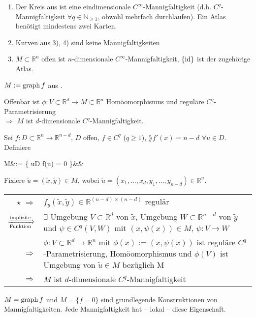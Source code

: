 \begin{example}
	\begin{enumerate}[label={\arabic*)}]
		\item Der Kreis aus  ist eine eindimensionale $C^{\infty}$-Mannigfaltigkeit (d.h. $C^q$-Mannigfaltigkeit $\forall q \in \mathbb{N}_{\ge 1}$, obwohl mehrfach durchlaufen). Ein Atlas benötigt mindestens zwei Karten.
		\item Kurven aus  3), 4) sind keine Mannigfaltigkeiten
		\item $M\subset \mathbb{R}^n$ offen ist $n$-dimensionale $C^\infty$-Mannigfaltigkeit, $\{ \operatorname{id} \}$ ist der zugehörige Atlas.
	\end{enumerate}
\end{example}

\begin{example}
	$M:= \operatorname{graph} f$ aus .
	
	Offenbar ist $\phi\!: V\subset \mathbb{R}^d\to M\subset \mathbb{R}^n$ Homöomorphismus und reguläre $C^q$-Parametrisierung\\
	 $\Rightarrow$ $M$ ist $d$-dimensionale $C^q$-Mannigfaltigkeit.
\end{example}

\begin{example}
	Sei $f\!:D\subset \mathbb{R}^n\to \mathbb{R}^{n-d}$, $D$ offen, $f\in C^q$ ($q\ge 1$), $\rang f'(x) = n-d$ $\forall u\in D$. Definiere \begin{flalign} \tag{\star} M&:= \{ u\in D \mid f(u) = 0 \}&&\end{flalign}
	
	Fixiere $\tilde{u} = (\tilde{x}, \tilde{y})\in M$, wobei $\tilde{u	} = (x_1, \dotsc, x_d, y_1, \dotsc, y_{n-d})\in \mathbb{R}^n$.
	
	\begin{tabularx}{\linewidth}{r@{\ }X}
		$\star$ $\Rightarrow$ & $f_y(\tilde{x}, \tilde{y})\in \mathbb{R}^{(n-d)\times(n-d)}$ regulär \\
		$\xRightarrow[\text{Funktion}]{\text{implizite}}$ & $\exists$ Umgebung $V\subset \mathbb{R}^d$ von $\tilde{x}$, Umgebung $W\subset \mathbb{R}^{n-d}$ von $\tilde{y}$ und $\psi \in C^q(V,W)$ mit $(x, \psi(x))\in M$, $\psi: V\to W$ \\
		$\Rightarrow$ & $\phi: V\subset \mathbb{R}^d \to \mathbb{R}^n$ mit $\phi(x) := (x, \psi(x))$ ist reguläre $C^q$-Parametrisierung, Homöomorphismus und $\phi(V)$ ist Umgebung von $\tilde{u} \in M$ bezüglich M \\
		$\Rightarrow$ & $M$ ist $d$-dimensionale $C^q$-Mannigfaltigkeit
	\end{tabularx}
\end{example}
\begin{underlinedenvironment}[Bemerkung]
	$M = \operatorname{graph} f$ und $M=\{f=0\}$ sind grundlegende Konstruktionen von Mannigfaltigkeiten. Jede Mannigfaltigkeit hat -- lokal -- diese Eigenschaft.
\end{underlinedenvironment}

